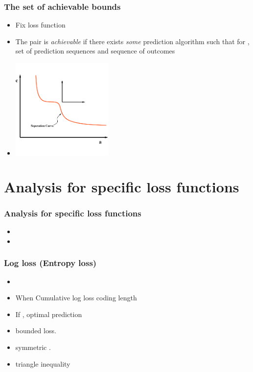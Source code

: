 \documentclass[handout]{beamer}
\begin{document}
\begin{frame}
\frametitle{The set of achievable bounds}
\begin{itemize}
\item 
Fix loss function \R{$\lambda: \Omega \times \Gamma \to [0,\infty)$}
\item
The pair  is {\em achievable} if there exists 
{\em some} prediction algorithm
such that for  ,  set of  prediction
sequences and  sequence of outcomes
\item
\begin{center}
\includegraphics[height=5cm]{figures/achievable1.pdf}
\end{center}
\end{itemize}
\end{frame}

\section{Analysis for specific loss functions}

\begin{frame}
\frametitle{Analysis for specific loss functions}
\begin{itemize}
\item
{}   
\item
{} 
\end{itemize}
\end{frame}

\begin{frame}
\frametitle{Log loss (Entropy loss)} 
\begin{itemize}
\item
\R{\[ \lambda_{\text{ent}}(\omega,\gamma) = \omega \ln \frac{\omega}{\gamma} 
                              +(1-\omega) \ln \frac{1-\omega}{1-\gamma} \]}
\item
When  Cumulative log loss \R{$=$} coding length 
\item
If , optimal prediction 
\item
{}bounded loss.
\item
{} symmetric .
\item
{} triangle inequality
\end{itemize}
\end{frame}
\end{document}
